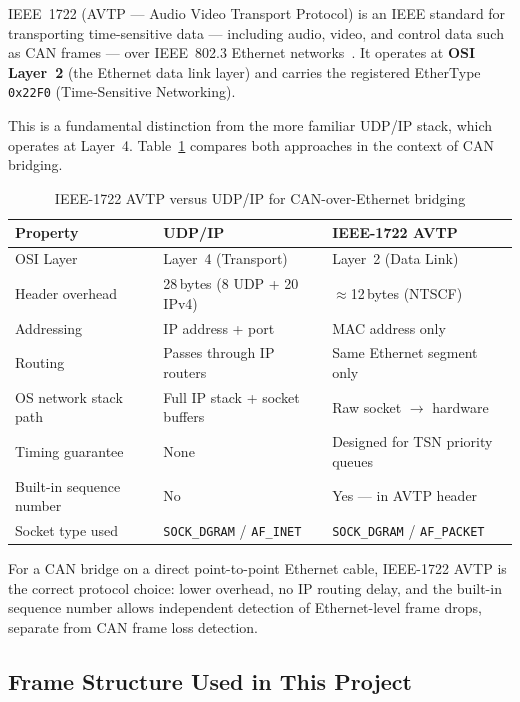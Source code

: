 \documentclass[11pt,a4paper]{article}
\begin{document}
IEEE~1722 (AVTP --- Audio Video Transport Protocol) is an IEEE standard for
transporting time-sensitive data --- including audio, video, and control data such as
CAN frames --- over IEEE~802.3 Ethernet networks~\cite{ieee1722}.  It operates at
\textbf{OSI Layer~2} (the Ethernet data link layer) and carries the registered
EtherType \texttt{0x22F0} (Time-Sensitive Networking).

This is a fundamental distinction from the more familiar UDP/IP stack, which operates
at Layer~4.  Table~\ref{tab:avtp_vs_udp} compares both approaches in the context of
CAN bridging.

\begin{table}[H]
    \centering
    \caption{IEEE-1722 AVTP versus UDP/IP for CAN-over-Ethernet bridging}
    \label{tab:avtp_vs_udp}
    \begin{tabularx}{\textwidth}{|l|X|X|}
        \hline
        \textbf{Property} & \textbf{UDP/IP} & \textbf{IEEE-1722 AVTP} \\
        \hline
        OSI Layer & Layer~4 (Transport) & Layer~2 (Data Link) \\
        \hline
        Header overhead & 28\,bytes (8 UDP + 20 IPv4) & $\approx$12\,bytes (NTSCF) \\
        \hline
        Addressing & IP address + port & MAC address only \\
        \hline
        Routing & Passes through IP routers & Same Ethernet segment only \\
        \hline
        OS network stack path & Full IP stack + socket buffers & Raw socket $\to$ hardware \\
        \hline
        Timing guarantee & None & Designed for TSN priority queues \\
        \hline
        Built-in sequence number & No & Yes --- in AVTP header \\
        \hline
        Socket type used & \texttt{SOCK\_DGRAM} / \texttt{AF\_INET} & \texttt{SOCK\_DGRAM} / \texttt{AF\_PACKET} \\
        \hline
    \end{tabularx}
\end{table}

For a CAN bridge on a direct point-to-point Ethernet cable, IEEE-1722 AVTP is the
correct protocol choice: lower overhead, no IP routing delay, and the built-in sequence
number allows independent detection of Ethernet-level frame drops, separate from CAN
frame loss detection.

\subsection{Frame Structure Used in This Project}
\end{document}
